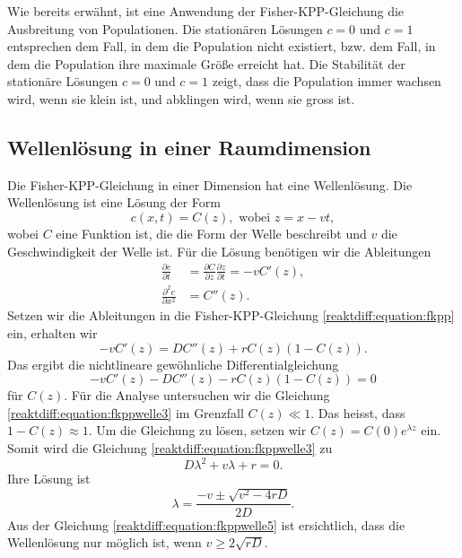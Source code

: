 Wie bereits erwähnt, ist eine Anwendung der Fisher-KPP-Gleichung die Ausbreitung von Populationen.
Die stationären Lösungen \(c = 0\) und \(c = 1\) entsprechen dem Fall, in dem die Population nicht existiert, bzw. dem Fall, in dem die Population ihre maximale Größe erreicht hat.
Die Stabilität der stationäre Lösungen \(c = 0\) und \(c = 1\) zeigt, dass die Population immer wachsen wird, wenn sie klein ist, und abklingen wird, wenn sie gross ist.

\subsection{Wellenlösung in einer Raumdimension
\label{reaktdiff:subsection:fkppwelle}}
Die Fisher-KPP-Gleichung in einer Dimension hat eine Wellenlösung.
Die Wellenlösung ist eine Lösung der Form
\begin{equation*}
\label{reaktdiff:equation:fkppwelle}
c(x,t) = C(z), \text{ wobei } z = x - vt,
\end{equation*}
wobei \(C\) eine Funktion ist, die die Form der Welle beschreibt und \(v\) die Geschwindigkeit der Welle ist.
Für die Lösung benötigen wir die Ableitungen
\begin{align*}
\frac{\partial c}{\partial t} &= \frac{\partial C}{\partial z}\frac{\partial z}{\partial t} = -vC'(z),
\\
\frac{\partial^2 c}{\partial x^2} &= C''(z).
\end{align*}
Setzen wir die Ableitungen in die Fisher-KPP-Gleichung \eqref{reaktdiff:equation:fkpp} ein, erhalten wir
\begin{equation*}
\label{reaktdiff:equation:fkppwelle2}
-vC'(z) = D C''(z) + rC(z)(1-C(z)).
\end{equation*}
Das ergibt die nichtlineare gewöhnliche Differentialgleichung
\begin{equation}
    \label{reaktdiff:equation:fkppwelle3}
    -vC'(z) - D C''(z) - rC(z)(1-C(z)) = 0
\end{equation}
für \(C(z)\).
Für die Analyse untersuchen wir die Gleichung \eqref{reaktdiff:equation:fkppwelle3} im Grenzfall \(C(z) \ll 1\).
Das heisst, dass \(1 - C(z)\approx 1\).
Um die Gleichung zu lösen, setzen wir \(C(z) = C(0) e^{\lambda z}\) ein.
Somit wird die Gleichung \eqref{reaktdiff:equation:fkppwelle3} zu
\begin{equation*}
D\lambda^2 + v\lambda + r = 0.
\end{equation*}
Ihre Lösung ist
\begin{equation}
\label{reaktdiff:equation:fkppwelle5}
\lambda = \frac{-v \pm \!\sqrt{v^2 - 4rD}}{2D}.
\end{equation}
Aus der Gleichung \eqref{reaktdiff:equation:fkppwelle5} ist ersichtlich, dass die Wellenlösung nur möglich ist, wenn \(v \ge 2\!\sqrt{rD}\).

